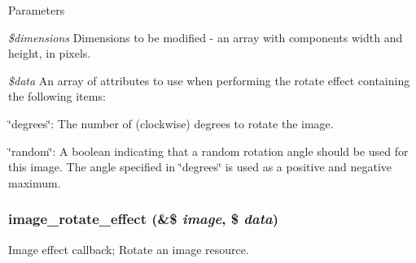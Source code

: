 \begin{DoxyParams}{Parameters}
\item[{\em \$dimensions}]Dimensions to be modified -\/ an array with components width and height, in pixels. \item[{\em \$data}]An array of attributes to use when performing the rotate effect containing the following items:
\begin{DoxyItemize}
\item \char`\"{}degrees\char`\"{}: The number of (clockwise) degrees to rotate the image.
\item \char`\"{}random\char`\"{}: A boolean indicating that a random rotation angle should be used for this image. The angle specified in \char`\"{}degrees\char`\"{} is used as a positive and negative maximum. 
\end{DoxyItemize}\end{DoxyParams}
\hypertarget{image_8effects_8inc_ad9acbcdd3e9f925b5e6f005c5f292283}{
\subsubsection[{image\_\-rotate\_\-effect}]{\setlength{\rightskip}{0pt plus 5cm}image\_\-rotate\_\-effect (\&\$ {\em image}, \/  \$ {\em data})}}
\label{image_8effects_8inc_ad9acbcdd3e9f925b5e6f005c5f292283}
Image effect callback; Rotate an image resource.


